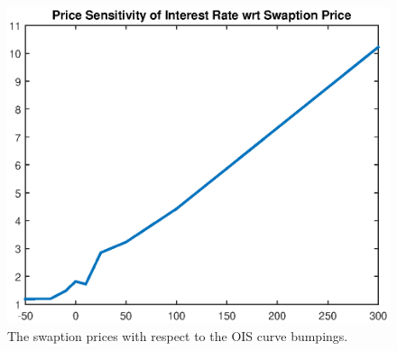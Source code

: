 \begin{center}
  \begin{figure}
  \centering
      \includegraphics[scale=0.6]{swaption_prices.eps}
      \caption{The swaption prices with respect to the OIS curve bumpings.}\label{fig::swaption_prices}
  \end{figure}
\end{center} 